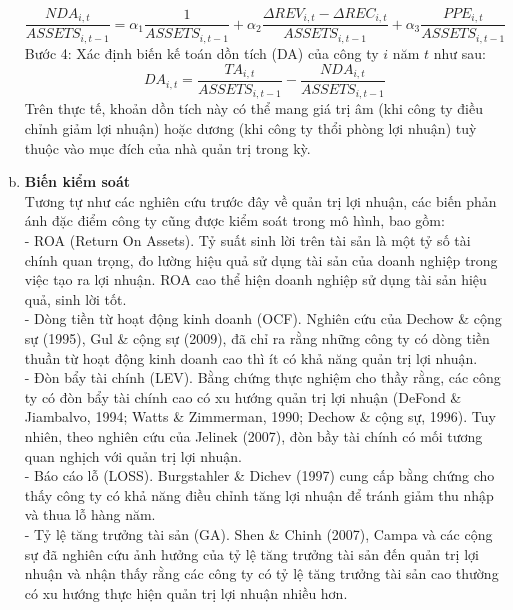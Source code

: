 \documentclass[a4paper]{article}
\begin{document}
\begin{enumerate}[a)]
\begin{equation}
\frac{NDA_{i,t}}{ASSETS_{i,t-1}} = \alpha_1 \frac{1}{ASSETS_{i,t-1}} + \alpha_2 \frac{\Delta REV_{i,t} - \Delta REC_{i,t}}{ASSETS_{i,t-1}} + \alpha_3 \frac{PPE_{i,t}}{ASSETS_{i,t-1}}
\end{equation}
Bước 4: Xác định biến kế toán dồn tích (DA) của công ty $i$ năm $t$ như sau:
\begin{equation}
DA_{i,t} = \frac{TA_{i,t}}{ASSETS_{i,t-1}} - \frac{NDA_{i,t}}{ASSETS_{i,t-1}}
\end{equation}
Trên thực tế, khoản dồn tích này có thể mang giá trị âm (khi công ty điều chỉnh giảm lợi nhuận) hoặc  dương (khi công ty thổi phòng lợi nhuận) tuỳ thuộc vào mục đích của nhà quản trị trong  kỳ.
\item\textbf{Biến kiểm soát}\\
Tương tự như các nghiên cứu trước đây về quản trị lợi nhuận, các biến phản ánh đặc điểm công ty cũng được kiểm soát trong mô hình, bao gồm:\\
- ROA (Return On Assets). Tỷ suất sinh lời trên tài sản là một tỷ số tài chính quan trọng, đo lường hiệu quả sử dụng tài sản của doanh nghiệp trong việc tạo ra lợi nhuận. ROA cao thể hiện doanh nghiệp sử dụng tài sản hiệu quả, sinh lời tốt.\\
- Dòng tiền từ hoạt động kinh doanh (OCF). Nghiên cứu của Dechow \& cộng sự (1995), Gul \& cộng sự (2009), đã chỉ ra rằng những  công ty có dòng tiền thuần từ hoạt động kinh doanh cao thì ít có khả năng quản trị lợi nhuận.\\
- Đòn bẩy tài chính  (LEV). Bằng chứng thực nghiệm cho thầy rằng, các công ty có đòn bẩy tài chính cao có xu hướng quản trị lợi nhuận (DeFond \& Jiambalvo, 1994; Watts \& Zimmerman, 1990; Dechow \& cộng sự, 1996). Tuy  nhiên, theo nghiên cứu của Jelinek (2007), đòn bầy tài chính có mối tương quan nghịch với quản trị lợi nhuận.\\
- Báo cáo lỗ (LOSS). Burgstahler \& Dichev (1997) cung cấp bằng chứng cho thấy công ty có khả năng điều chỉnh tăng lợi nhuận để tránh giảm thu nhập và thua lỗ hàng năm.\\
- Tỷ lệ tăng trưởng tài sản (GA). Shen \& Chinh (2007), Campa và các cộng sự đã nghiên cứu ảnh hưởng của tỷ lệ tăng trưởng tài sản đến quản trị lợi nhuận và nhận thấy rằng các công ty có tỷ lệ tăng trưởng tài sản cao thường có xu hướng thực hiện quản trị lợi nhuận nhiều hơn.
\end{enumerate}
\end{document}
